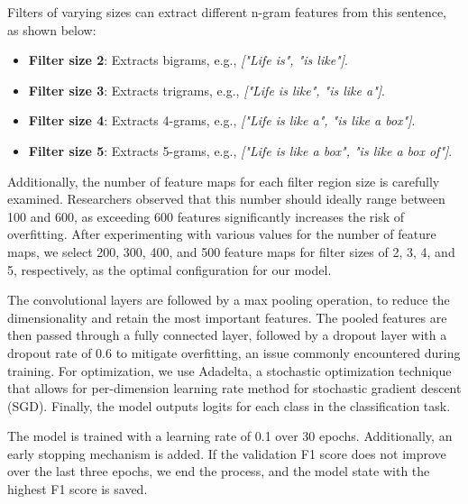 Filters of varying sizes can extract different n-gram features from this sentence, as shown below:

\begin{itemize}
    \item \textbf{Filter size 2}: Extracts bigrams, e.g., 
    \textit{["Life is", "is like"]}.
    
    \item \textbf{Filter size 3}: Extracts trigrams, e.g., 
    \textit{["Life is like", "is like a"]}.
    
    \item \textbf{Filter size 4}: Extracts 4-grams, e.g., 
    \textit{["Life is like a", "is like a box"]}.
    
    \item \textbf{Filter size 5}: Extracts 5-grams, e.g., 
    \textit{["Life is like a box", "is like a box of"]}.
\end{itemize}

\vspace{3mm} 

Additionally, the number of feature maps for each filter region size is carefully examined. Researchers observed that this number should ideally range between 100 and 600, as exceeding 600 features significantly increases the risk of overfitting. After experimenting with various values for the number of feature maps, we select 200, 300, 400, and 500 feature maps for filter sizes of 2, 3, 4, and 5, respectively, as the optimal configuration for our model.

\vspace{3mm} 

The convolutional layers are followed by a max pooling operation, to reduce the dimensionality and retain the most important features. The pooled features are then passed through a fully connected layer, followed by a dropout layer with a dropout rate of 0.6 to mitigate overfitting, an issue commonly encountered during training. For optimization, we use Adadelta, a stochastic optimization technique that allows for per-dimension learning rate method for stochastic gradient descent (SGD). Finally, the model outputs logits for each class in the classification task.

\vspace{3mm} 

The model is trained with a learning rate of 0.1 over 30 epochs. Additionally, an early stopping mechanism is added. If the validation F1 score does not improve over the last three epochs, we end the process, and the model state with the highest F1 score is saved.

